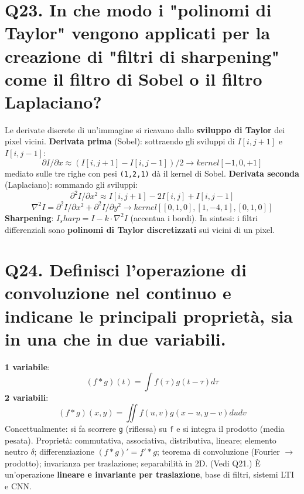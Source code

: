 \documentclass[11pt,a4paper]{article}
\begin{document}
\section*{Q23. In che modo i "polinomi di Taylor" vengono applicati per la creazione di "filtri di sharpening" come il filtro di Sobel o il filtro Laplaciano?}
Le derivate discrete di un'immagine si ricavano dallo \textbf{sviluppo di Taylor} dei pixel vicini.
\textbf{Derivata prima} (Sobel): sottraendo gli sviluppi di $I[i,j+1]$ e $I[i,j-1]$:
\[ \partial I/\partial x \approx  (I[i,j+1] - I[i,j-1]) / 2     \to  kernel [-1, 0, +1] \]
mediato sulle tre righe con pesi \texttt{(1,2,1)} dà il kernel di Sobel.
\textbf{Derivata seconda} (Laplaciano): sommando gli sviluppi:
\[ \partial ^{2}I/\partial x^{2} \approx  I[i,j+1] - 2I[i,j] + I[i,j-1] \]
\[ \nabla ^{2}I = \partial ^{2}I/\partial x^{2} + \partial ^{2}I/\partial y^{2}   \to  kernel [[0,1,0],[1,-4,1],[0,1,0]] \]
\textbf{Sharpening}: $I_sharp = I - k\cdot \nabla ^{2}I$ (accentua i bordi). In sintesi: i filtri differenziali sono \textbf{polinomi di Taylor discretizzati} sui vicini di un pixel.
\newpage
\section*{Q24. Definisci l'operazione di convoluzione nel continuo e indicane le principali proprietà, sia in una che in due variabili.}
\textbf{1 variabile}:
\[ (f * g)(t) = \int  f(\tau ) g(t - \tau ) d\tau  \]
\textbf{2 variabili}:
\[ (f * g)(x,y) = \iint  f(u,v) g(x-u, y-v) du dv \]
Concettualmente: si fa scorrere \texttt{g} (riflessa) su \texttt{f} e si integra il prodotto (media pesata).
Proprietà: commutativa, associativa, distributiva, lineare; elemento neutro $\delta $; differenziazione $(f*g)' = f'*g$; teorema di convoluzione (Fourier $\to $ prodotto); invarianza per traslazione; separabilità in 2D. (Vedi Q21.) È un'operazione \textbf{lineare e invariante per traslazione}, base di filtri, sistemi LTI e CNN.
\newpage
\end{document}
